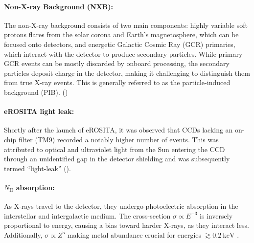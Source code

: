 \paragraph*{Non-X-ray Background (NXB):} The non-X-ray background consists of two main components: highly variable soft protons flares from the solar corona and Earth's magnetosphere, which can be focused onto detectors, and energetic Galactic Cosmic Ray (GCR) primaries, which interact with the detector to produce secondary particles. While primary GCR events can be mostly discarded by onboard processing, the secondary particles deposit charge in the detector, making it challenging to distinguish them from true X-ray events. This is generally referred to as the particle-induced background (PIB). (\cite{Bulbul_2020})
\paragraph*{eROSITA light leak:} Shortly after the launch of eROSITA, it was observed that CCDs lacking an on-chip filter (TM9) recorded a notably higher number of events. This was attributed to optical and ultraviolet light from the Sun entering the CCD through an unidentified gap in the detector shielding and was subsequently termed \enquote{light-leak} (\cite{Predehl2021}).
\paragraph*{\(N_\text{H}\) absorption:} 
As X-rays travel to the detector, they undergo photoelectric absorption in the interstellar and intergalactic medium. The cross-section \(\sigma \propto E^{-3}\) is inversely proportional to energy, causing a bias toward harder X-rays, as they interact less. Additionally, \(\sigma \propto Z^5\) making metal abundance crucial for energies \(\gtrsim \SI{0.2}{\kilo\electronvolt}\) \cite{Willingale2013}.

